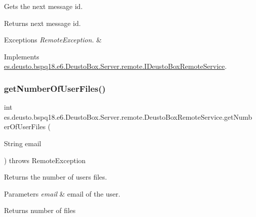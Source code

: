 Gets the next message id. \begin{DoxyReturn}{Returns}
next message id. 
\end{DoxyReturn}

\begin{DoxyExceptions}{Exceptions}
{\em Remote\+Exception.} & \\
\hline
\end{DoxyExceptions}


Implements \mbox{\hyperlink{interfacees_1_1deusto_1_1bspq18_1_1e6_1_1_deusto_box_1_1_server_1_1remote_1_1_i_deusto_box_remote_service_afa1bd951be454101604c8a2019da59f8}{es.\+deusto.\+bspq18.\+e6.\+Deusto\+Box.\+Server.\+remote.\+I\+Deusto\+Box\+Remote\+Service}}.

\mbox{\label{classes_1_1deusto_1_1bspq18_1_1e6_1_1_deusto_box_1_1_server_1_1remote_1_1_deusto_box_remote_service_a2425af40ab1d0aaa9de2954d5d841807}} 
\subsubsection{\texorpdfstring{get\+Number\+Of\+User\+Files()}{getNumberOfUserFiles()}}
{\footnotesize\ttfamily int es.\+deusto.\+bspq18.\+e6.\+Deusto\+Box.\+Server.\+remote.\+Deusto\+Box\+Remote\+Service.\+get\+Number\+Of\+User\+Files (\begin{DoxyParamCaption}\item[{String}]{email }\end{DoxyParamCaption}) throws Remote\+Exception}

Returns the number of user\textquotesingle{}s files.


\begin{DoxyParams}{Parameters}
{\em email} & email of the user. \\
\hline
\end{DoxyParams}
\begin{DoxyReturn}{Returns}
number of files 
\end{DoxyReturn}

